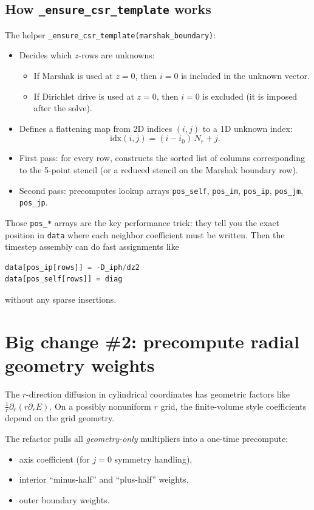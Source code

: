 \documentclass[11pt]{article}
\begin{document}
\subsection*{How \texttt{\_ensure\_csr\_template} works}
The helper \texttt{\_ensure\_csr\_template(marshak\_boundary)}:
\begin{itemize}
  \item Decides which $z$-rows are unknowns:
  \begin{itemize}
    \item If Marshak is used at $z=0$, then $i=0$ is included in the unknown vector.
    \item If Dirichlet drive is used at $z=0$, then $i=0$ is excluded (it is imposed after the solve).
  \end{itemize}
  \item Defines a flattening map from 2D indices $(i,j)$ to a 1D unknown index:
  \[
    \mathrm{idx}(i,j) = (i-i_0)\,N_r + j.
  \]
  \item First pass: for every row, constructs the sorted list of columns corresponding to the 5-point stencil (or a reduced stencil on the Marshak boundary row).
  \item Second pass: precomputes lookup arrays \texttt{pos\_self}, \texttt{pos\_im}, \texttt{pos\_ip}, \texttt{pos\_jm}, \texttt{pos\_jp}.
\end{itemize}

Those \texttt{pos\_*} arrays are the key performance trick: they tell you the exact position in \texttt{data} where each neighbor coefficient must be written. Then the timestep assembly can do fast assignments like
\begin{lstlisting}[language=Python]
data[pos_ip[rows]] = -D_iph/dz2
data[pos_self[rows]] = diag
\end{lstlisting}
without any sparse insertions.

\section*{Big change \#2: precompute radial geometry weights}
The $r$-direction diffusion in cylindrical coordinates has geometric factors like $\frac{1}{r}\partial_r(r\partial_r E)$. On a possibly nonuniform $r$ grid, the finite-volume style coefficients depend on the grid geometry.

The refactor pulls all \emph{geometry-only} multipliers into a one-time precompute:
\begin{itemize}
  \item axis coefficient (for $j=0$ symmetry handling),
  \item interior ``minus-half'' and ``plus-half'' weights,
  \item outer boundary weights.
\end{itemize}
\end{document}
